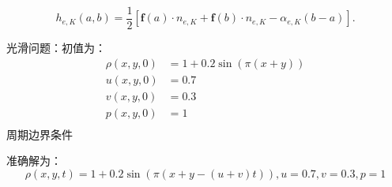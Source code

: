 \documentclass{book}
\begin{document}
\begin{equation}
  h_{e, K}(a, b)=\frac{1}{2}\left[\mathbf{f}(a) \cdot n_{e, K}+\mathbf{f}(b) \cdot n_{e, K}-\alpha_{e, K}(b-a)\right] .
\end{equation}

\begin{example}
  光滑问题：初值为：
  \begin{equation}
    \begin{aligned}
      \rho(x,y,0) & = 1+0.2\sin(\pi(x+y)) \\
      u(x,y,0)    & = 0.7                 \\
      v(x,y,0)    & = 0.3                 \\
      p(x,y,0)    & = 1                   \\
    \end{aligned}
  \end{equation}
  周期边界条件

  准确解为：
  \begin{equation}
    \rho(x,y,t) = 1+0.2\sin(\pi(x+y-(u+v)t)),u=0.7,v=0.3,p=1
  \end{equation}
\end{example}
\end{document}
